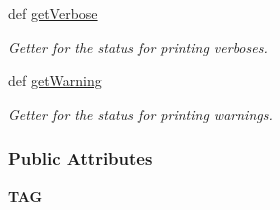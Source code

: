 \begin{DoxyCompactItemize}
def \hyperlink{classlog_1_1_log_a6a2e495f8ad0cd15e3a407478f1fb584}{get\-Verbose}
\begin{DoxyCompactList}\small\item\em Getter for the status for printing verboses. \end{DoxyCompactList}\item 
def \hyperlink{classlog_1_1_log_a3f11ccc10a669d3a64aca1cf6b62bfda}{get\-Warning}
\begin{DoxyCompactList}\small\item\em Getter for the status for printing warnings. \end{DoxyCompactList}\end{DoxyCompactItemize}
\subsubsection*{Public Attributes}
\begin{DoxyCompactItemize}
\item 
\hypertarget{classlog_1_1_log_a70a654290adc9f9a0d03b22f83af44d4}{{\bfseries T\-A\-G}}\label{classlog_1_1_log_a70a654290adc9f9a0d03b22f83af44d4}

\end{DoxyCompactItemize}
